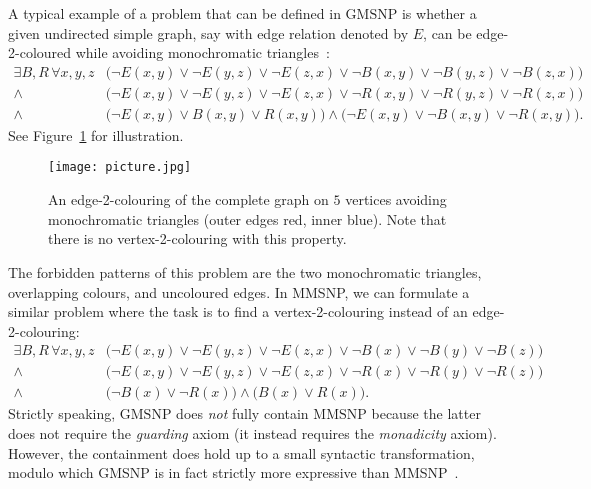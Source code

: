\documentclass[oneside,reqno,12pt]{amsart}
\theoremstyle{plain}
\theoremstyle{remark}
\newcommand{\MMSNP}{\ensuremath{\mathrm{MMSNP}}\xspace}
\newcommand{\GMSNP}{\ensuremath{\mathrm{GMSNP}}\xspace}
\begin{document}
A typical example of a problem that can be defined in $\GMSNP$ is whether a given undirected simple graph, say with edge relation denoted by $E$,  can be edge-2-coloured while avoiding monochromatic triangles~\cite{garey1979computers}:
\begin{align}\label{ex:gmsnp_introduction} 
  \exists B, R\, \forall x,y,z &\big(  \neg E(x,y) \vee   \neg  E(y,z) \vee \neg E(z,x) \vee \neg B(x,y) \vee   \neg  B(y,z) \vee \neg B(z,x)   
    \big) \nonumber \\
     {} \wedge \,  &\big(   \neg  E(x,y) \vee  \neg E(y,z) \vee \neg E(z,x) \vee  \neg R(x,y) \vee  \neg R(y,z) \vee \neg  R(z,x)   
    \big)   \\ 
   {} \wedge \,  &\big( \neg E(x,y) \vee B(x,y) \vee R(x,y) \big) \wedge \big( \neg E(x,y) \vee \neg B(x,y) \vee \neg R(x,y) \big).\nonumber 
\end{align} 
See Figure~\ref{fig:nomonotri} for illustration.
\begin{figure}[ht]
     \centering
      \texttt{[image: picture.jpg]}   
     \caption{An edge-2-colouring of the complete graph on $5$ vertices avoiding monochromatic triangles (outer edges red, inner blue). Note that there is no vertex-2-colouring with this property.}
     \label{fig:nomonotri}
 \end{figure}
The forbidden patterns of this problem are the two monochromatic triangles, overlapping colours, and uncoloured edges.
In MMSNP, we can formulate a similar problem where the task is to find a vertex-2-colouring instead of an edge-2-colouring: 
\begin{align} \label{ex:gmsnp_introduction2}
    \exists B, R\, \forall x,y,z 
   & \big(  \neg E(x,y) \vee   \neg  E(y,z) \vee \neg E(z,x) \vee \neg B(x) \vee   \neg  B(y) \vee \neg B(z)   
    \big) \nonumber  \\
   {} \wedge \, & \big(  \neg E(x,y) \vee   \neg  E(y,z) \vee \neg E(z,x) \vee \neg R(x) \vee   \neg  R(y) \vee \neg R(z)   
    \big)   \\ 
  {} \wedge \,  & \big( \neg B(x) \vee \neg R(x) \big) \wedge   \big(    B(x) \vee   R(x) \big). \nonumber
\end{align} 
Strictly speaking, $\GMSNP$ does \emph{not} fully contain $\MMSNP$ because the latter does not require the \emph{guarding} axiom (it instead requires the \emph{monadicity} axiom).
However, the containment does hold up to a small syntactic transformation, 
modulo which GMSNP is in fact strictly more expressive than MMSNP~\cite{bienvenu2014}.   
\end{document}
